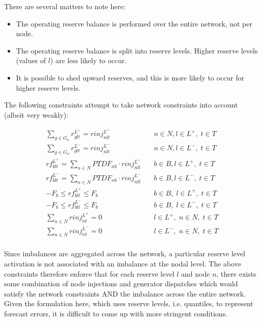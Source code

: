 \documentclass[number,times]{elsarticle}
\begin{document}
There are several matters to note here:

\begin{itemize}
    \item The operating reserve balance is performed over the entire network, not per node.
    \item The operating reserve balance is split into reserve levels. Higher reserve levels (values of $l$) are less likely to occur.
    \item It is possible to shed upward reserves, and this is more likely to occur for higher reserve levels.
\end{itemize}

The following constraints attempt to take network constraints into account (albeit very weakly):

\begin{align}
    \sum_{g \in G_n} r^{L^+}_{glt} = rinj^{L^+}_{nlt}                & \quad n \in N, l \in L^+, \; t \in T    \\
    \sum_{g \in G_n} r^{L^-}_{glt} = rinj^{L^-}_{nlt}                & \quad n \in N, l \in L^-, \; t \in T    \\
    rf^{L^+}_{blt} = \sum_{n \in N} PTDF_{nb} \cdot rinj^{L^+}_{nlt} & \quad b \in B, l \in L^+, \; t \in T    \\
    rf^{L^-}_{blt} = \sum_{n \in N} PTDF_{nb} \cdot rinj^{L^-}_{nlt} & \quad b \in B, l \in L^-, \; t \in T    \\
    -F_{b} \leq rf^{L^+}_{blt} \leq F_b                              & \quad b \in B, \; l \in L^+, \; t \in T \\
    -F_{b} \leq rf^{L^-}_{blt} \leq F_b                              & \quad b \in B, \; l \in L^-, \; t \in T \\
    \sum_{n \in N} rinj^{L^+}_{nt} = 0                               & \quad l \in L^+, \; n \in N, \; t \in T \\
    \sum_{n \in N} rinj^{L^-}_{nt} = 0                               & \quad l \in L^-, \; n \in N, \; t \in T \\
\end{align}

Since imbalances are aggregated across the network, a particular reserve level activation is not associated with an imbalance at the nodal level. The above constraints therefore enforce that for each reserve level $l$ and node $n$, there exists some combination of node injections and generator dispatches which would satisfy the network constraints AND the imbalance across the entire network. Given the formulation here, which uses reserve levels, i.e. quantiles, to represent forecast errors, it is difficult to come up with more stringent conditions.
\end{document}
